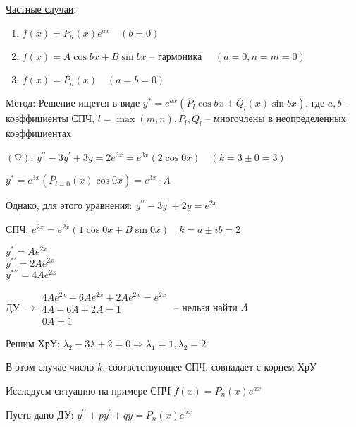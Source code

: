 \documentclass[12pt]{article}
\begin{document}
    \underline{Частные случаи}:

    \begin{enumerate}
        \item $f(x) = P_n(x) e^{ax} \quad (b = 0)$

        \item $f(x) = A\cos b x + B \sin bx$ -- гармоника $\quad (a = 0, n = m = 0)$

        \item $f(x) = P_n(x) \quad (a = b = 0)$
    \end{enumerate}

    Метод: Решение ищется в виде $y^* = e^{ax} (\overline{P}_l \cos bx + \overline{Q}_l (x) \sin bx)$,
    где $a, b$ -- коэффициенты СПЧ, $l = \max(m, n), \overline{P}_l, \overline{Q}_l$ -- многочлены в неопределенных коэффициентах

     $(\heartsuit)$: $y^{\prime\prime} - 3y^\prime + 3y = 2e^{3x} = e^{3x} (2 \cos 0x) \quad (k = 3 \pm 0 = 3)$

    $y^* = e^{3x} (\overline{P}_{l = 0} (x) \cos 0x) = e^{3x} \cdot A$

     Однако, для этого уравнения: $y^{\prime\prime} - 3y^\prime + 2y = e^{2x}$

    СПЧ: $e^{2x} = e^{2x} (1 \cos 0x + B \sin 0x) \quad k = a \pm ib = 2$

    \begin{rcases*}
    $y^* = Ae^{2x}$ \\
    $y^{*\prime} = 2Ae^{2x}$ \\
    $y^{*\prime\prime} = 4Ae^{2x}$ \\
    \end{rcases*} ДУ $\longrightarrow \begin{matrix}4Ae^{2x} - 6Ae^{2x} + 2Ae^{2x} = e^{2x} \\ 4A - 6A + 2A = 1 \\ 0A = 1\end{matrix}$ -- нельзя найти $A$ {\Huge 🤯}

    Решим ХрУ: $\lambda_2 - 3\lambda + 2 = 0 \Longrightarrow \lambda_1 = 1, \lambda_2 = 2$

    В этом случае число $k$, соответствующее СПЧ, совпадает с корнем ХрУ

    \smallvspace

    Исследуем ситуацию на примере СПЧ $f(x) = P_n(x) e^{ax}$

    Пусть дано ДУ: $y^{\prime\prime} + py^\prime + qy = P_n(x)e^{ax}$
\end{document}

